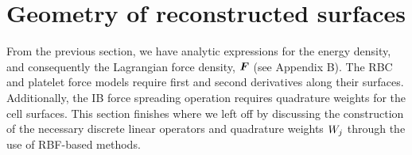 



\section{Geometry of reconstructed surfaces}\label{sec:rbfs}

From the previous section, we have analytic expressions for the energy density, and
consequently the Lagrangian force density, $\boldsymbol{F}$ (see Appendix B). The RBC and platelet
force models require first and second derivatives along their surfaces. Additionally, the
IB force spreading operation requires quadrature weights for the cell surfaces. This
section finishes where we left off by discussing the construction of the necessary
discrete linear operators and quadrature weights $\weight[j]$ through the use of
RBF-based methods.





